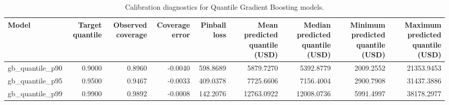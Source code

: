 \begin{table}
\caption{Calibration diagnostics for Quantile Gradient Boosting models.}
\label{tab:08-quantile-model-calibration}
\begin{tabular}{lrrrrrrrr}
\toprule
Model & Target quantile & Observed coverage & Coverage error & Pinball loss & Mean predicted quantile (USD) & Median predicted quantile (USD) & Minimum predicted quantile (USD) & Maximum predicted quantile (USD) \\
\midrule
gb_quantile_p90 & 0.9000 & 0.8960 & -0.0040 & 598.8689 & 5879.7270 & 5392.8779 & 2009.2552 & 21353.9453 \\
gb_quantile_p95 & 0.9500 & 0.9467 & -0.0033 & 409.0378 & 7725.6606 & 7156.4004 & 2900.7908 & 31437.3886 \\
gb_quantile_p99 & 0.9900 & 0.9892 & -0.0008 & 142.2076 & 12763.0922 & 12008.0736 & 5991.4997 & 38178.2977 \\
\bottomrule
\end{tabular}
\end{table}
